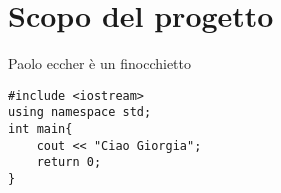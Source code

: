 \section{Scopo del progetto}
Paolo eccher è un finocchietto

\begin{lstlisting}
#include <iostream>
using namespace std;
int main{
	cout << "Ciao Giorgia";
	return 0;
}
\end{lstlisting}

